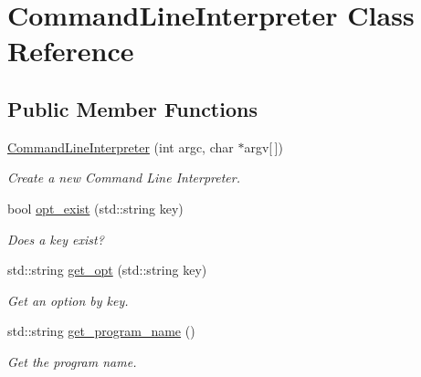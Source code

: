 \hypertarget{classCommandLineInterpreter}{\section{Command\-Line\-Interpreter Class Reference}
\label{classCommandLineInterpreter}
}
\subsection*{Public Member Functions}
\begin{DoxyCompactItemize}
\item 
\hyperlink{classCommandLineInterpreter_a01f8bc835f57c535fd20b75d83825067}{Command\-Line\-Interpreter} (int argc, char $\ast$argv\mbox{[}$\,$\mbox{]})
\begin{DoxyCompactList}\small\item\em Create a new Command Line Interpreter. \end{DoxyCompactList}\item 
\hypertarget{classCommandLineInterpreter_ac47f18ba85e0a282c1e4e073aa9681e6}{bool \hyperlink{classCommandLineInterpreter_ac47f18ba85e0a282c1e4e073aa9681e6}{opt\-\_\-exist} (std\-::string key)}\label{classCommandLineInterpreter_ac47f18ba85e0a282c1e4e073aa9681e6}

\begin{DoxyCompactList}\small\item\em Does a key exist? \end{DoxyCompactList}\item 
\hypertarget{classCommandLineInterpreter_a98b3e98a2a9f6bb1df34e7c1ce438738}{std\-::string \hyperlink{classCommandLineInterpreter_a98b3e98a2a9f6bb1df34e7c1ce438738}{get\-\_\-opt} (std\-::string key)}\label{classCommandLineInterpreter_a98b3e98a2a9f6bb1df34e7c1ce438738}

\begin{DoxyCompactList}\small\item\em Get an option by key. \end{DoxyCompactList}\item 
std\-::string \hyperlink{classCommandLineInterpreter_a6d8a4dd860eca967dc27c47d06e92075}{get\-\_\-program\-\_\-name} ()
\begin{DoxyCompactList}\small\item\em Get the program name. \end{DoxyCompactList}\end{DoxyCompactItemize}


